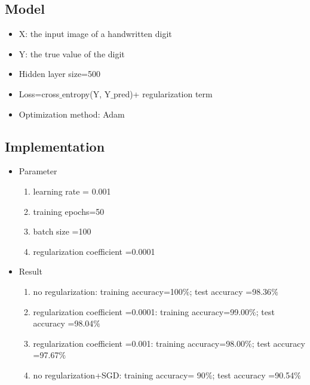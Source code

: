 \documentclass[12pt]{article}
\begin{document}
\begin{CJK*}{UTF8}{gbsn}
\subsection{Model}
\begin{itemize}
\item X: the input image of a handwritten digit
\item Y: the true value of the digit
\item Hidden layer size=500
\item Loss=cross$\_$entropy(Y, Y$\_$pred)+ regularization term
\item Optimization method: Adam
\end{itemize}

\subsection{Implementation }
\begin{itemize}
\item Parameter
\begin{enumerate}
\item learning rate = 0.001
\item training epochs=50
\item batch size =100
\item regularization coefficient =0.0001
\end{enumerate}
\item Result
\begin{enumerate}
\item no regularization: training accuracy=100$\%$; test accuracy =98.36$\%$
\item regularization coefficient =0.0001: training accuracy=99.00$\%$; test accuracy =98.04$\%$
\item regularization coefficient =0.001: training accuracy=98.00$\%$; test accuracy =97.67$\%$
\item no regularization+SGD: training accuracy= 90$\%$; test accuracy =90.54$\%$
\end{enumerate}

\end{itemize}








\end{CJK*}
\end{document}
